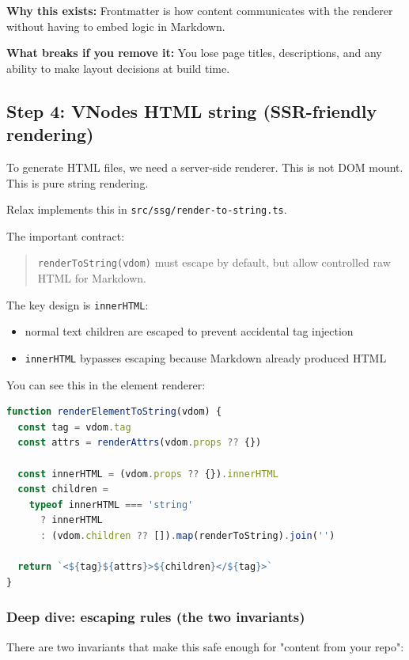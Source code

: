 \textbf{Why this exists:}
Frontmatter is how content communicates with the renderer without having to embed logic in Markdown.

\textbf{What breaks if you remove it:}
You lose page titles, descriptions, and any ability to make layout decisions at build time.

\subsection{Step 4: VNodes \textrightarrow HTML string (SSR-friendly rendering)}
To generate HTML files, we need a server-side renderer.
This is not DOM mount.
This is pure string rendering.

Relax implements this in \texttt{src/ssg/render-to-string.ts}.

The important contract:

\begin{quote}
\texttt{renderToString(vdom)} must escape by default, but allow controlled raw HTML for Markdown.
\end{quote}

The key design is \texttt{innerHTML}:

\begin{itemize}
  \item normal text children are escaped to prevent accidental tag injection
  \item \texttt{innerHTML} bypasses escaping because Markdown already produced HTML
\end{itemize}

You can see this in the element renderer:

\begin{lstlisting}[style=relax,language=JavaScript,caption={\texttt{innerHTML} rendering in \texttt{renderToString()}.}]
function renderElementToString(vdom) {
  const tag = vdom.tag
  const attrs = renderAttrs(vdom.props ?? {})

  const innerHTML = (vdom.props ?? {}).innerHTML
  const children =
    typeof innerHTML === 'string'
      ? innerHTML
      : (vdom.children ?? []).map(renderToString).join('')

  return `<${tag}${attrs}>${children}</${tag}>`
}
\end{lstlisting}

\subsubsection{Deep dive: escaping rules (the two invariants)}
There are two invariants that make this safe enough for "content from your repo":

